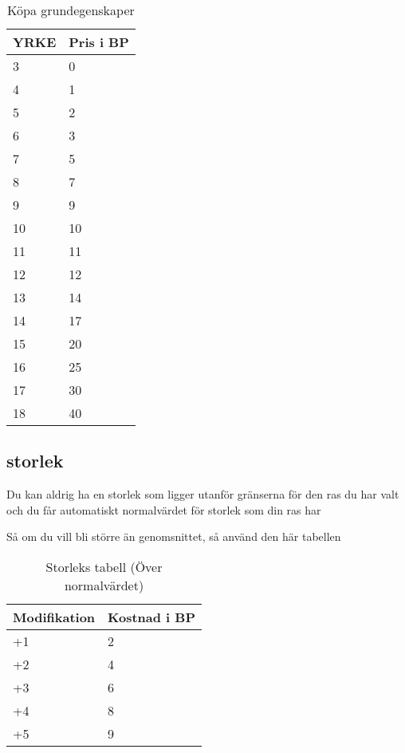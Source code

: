 \documentclass[a4paper, 10pt, titlepage]{article}
\begin{document}
\begin{table}[hbp]
  \caption{Köpa grundegenskaper}
  \begin{center}
  \begin{tabular}{|l|l|}
    \hline
    YRKE & Pris i BP \\
    \hline
    3    & 0 \\
    \hline
    4    & 1 \\
    \hline
    5    & 2 \\
    \hline
    6    & 3 \\
    \hline
    7    & 5 \\
    \hline
    8    & 7 \\
    \hline
    9    & 9 \\
    \hline
    10   & 10 \\
    \hline
    11   & 11 \\
    \hline
    12   & 12 \\
    \hline
    13   & 14 \\
    \hline
    14   & 17 \\
    \hline
    15   & 20 \\
    \hline
    16   & 25 \\
    \hline
    17   & 30 \\
    \hline
    18   & 40 \\
    \hline
  \end{tabular}
  \end{center}
\end{table}

\subsection{storlek}
Du kan aldrig ha en storlek som ligger utanför gränserna för den ras du har valt och
du får automatiskt normalvärdet för storlek som din ras har

Så om du vill bli större än genomsnittet, så använd den här tabellen
\begin{table}[hbp]
  \caption{Storleks tabell (Över normalvärdet)}
  \begin{tabular}{|l|l|}
    \hline
    Modifikation & Kostnad i BP \\
    \hline
    +1           & 2            \\
    \hline
    +2           & 4            \\
    \hline
    +3           & 6            \\
    \hline
    +4           & 8            \\
    \hline
    +5           & 9            \\
    \hline
  \end{tabular}
\end{table}
\end{document}
